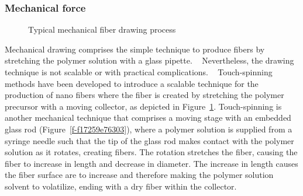 \subsubsection{Mechanical force}
\bgroup
\begin{figure}[!htbp]
\centering \makeatletter{}
\makeatother 
\caption{{Typical mechanical fiber drawing process}}
\label{f-432d16f420fb}
\end{figure}

\egroup
Mechanical drawing comprises the simple technique to produce fibers by stretching the polymer solution with a glass pipette. \unskip~\cite{527120:14024998} Nevertheless, the drawing technique is not scalable or with practical complications. \unskip~\cite{527120:14025041} Touch-spinning methods have been developed to introduce a scalable technique for the production of nano fibers where the fiber is created by stretching the polymer precursor with a moving collector, as depicted in Figure~\ref{f-432d16f420fb}. Touch-spinning is another mechanical technique that comprises a moving stage with an embedded glass rod (Figure~\ref{f-f17259e76303}), where a polymer solution is supplied from a syringe needle such that the tip of the glass rod makes contact with the polymer solution as it rotates, creating fibers. The rotation stretches the fiber, causing the fiber to increase in length and decrease in diameter. The increase in length causes the fiber surface are to increase and therefore making the polymer solution solvent to volatilize, ending with a dry fiber within the collector.


